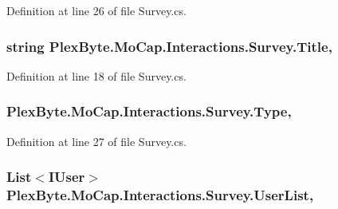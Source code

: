 Definition at line 26 of file Survey.\+cs.

\subsubsection[{\texorpdfstring{Title}{Title}}]{\setlength{\rightskip}{0pt plus 5cm}string Plex\+Byte.\+Mo\+Cap.\+Interactions.\+Survey.\+Title\hspace{0.3cm}{\ttfamily [get]}, {\ttfamily [set]}}\hypertarget{class_plex_byte_1_1_mo_cap_1_1_interactions_1_1_survey_a590e6dd00026c7c039fd61e3166b7170}{}\label{class_plex_byte_1_1_mo_cap_1_1_interactions_1_1_survey_a590e6dd00026c7c039fd61e3166b7170}


Definition at line 18 of file Survey.\+cs.

\subsubsection[{\texorpdfstring{Type}{Type}}]{ Plex\+Byte.\+Mo\+Cap.\+Interactions.\+Survey.\+Type\hspace{0.3cm}{\ttfamily [get]}, {\ttfamily [set]}}\hypertarget{class_plex_byte_1_1_mo_cap_1_1_interactions_1_1_survey_a339b8292ba9abcab9a2f1aad096bb264}{}\label{class_plex_byte_1_1_mo_cap_1_1_interactions_1_1_survey_a339b8292ba9abcab9a2f1aad096bb264}


Definition at line 27 of file Survey.\+cs.

\subsubsection[{\texorpdfstring{User\+List}{UserList}}]{\setlength{\rightskip}{0pt plus 5cm}List$<$I\+User$>$ Plex\+Byte.\+Mo\+Cap.\+Interactions.\+Survey.\+User\+List\hspace{0.3cm}{\ttfamily [get]}, {\ttfamily [set]}}\hypertarget{class_plex_byte_1_1_mo_cap_1_1_interactions_1_1_survey_abf34631f6e58537dbdfef1914ff863f9}{}\label{class_plex_byte_1_1_mo_cap_1_1_interactions_1_1_survey_abf34631f6e58537dbdfef1914ff863f9}


